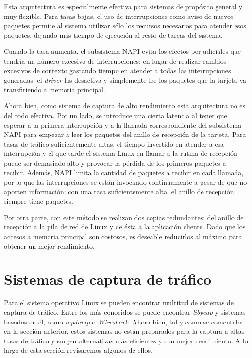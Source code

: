 \documentclass[twoside, 12pt, draft]{epstfg}
\begin{document}
Esta arquitectura es especialmente efectiva para sistemas de propósito general y muy flexible. Para tasas bajas, el uso de interrupciones como aviso de nuevos paquetes permite al sistema utilizar sólo los recursos necesarios para atender esos paquetes, dejando más tiempo de ejecución al resto de tareas del sistema.

Cuando la tasa aumenta, el subsistema NAPI evita los efectos perjudiciales que tendría un número excesivo de interrupciones: en lugar de realizar cambios excesivos de contexto gastando tiempo en atender a todas las interrupciones generadas, el \textit{driver} las desactiva y simplemente lee los paquetes que la tarjeta va transfiriendo a memoria principal.

Ahora bien, como sistema de captura de alto rendimiento esta arquitectura no es del todo efectiva. Por un lado, se introduce una cierta latencia al tener que esperar a la primera interrupción y a la llamada correspondiente del subsistema NAPI para empezar a leer los paquetes del anillo de recepción de la tarjeta. Para tasas de tráfico suficientemente altas, el tiempo invertido en atender a esa interrupción y el que tarde el sistema Linux en llamar a la rutina de recepción puede ser demasiado alto y provocar la pérdida de los primeros paquetes a recibir. Además, NAPI limita la cantidad de paquetes a recibir en cada llamada, por lo que las interrupciones se están invocando continuamente a pesar de que no aporten información: con una tasa suficientemente alta, el anillo de recepción siempre tiene paquetes.

Por otra parte, con este método se realizan dos copias redundantes: del anillo de recepción a la pila de red de Linux y de ésta a la aplicación cliente. Dado que los accesos a memoria principal son costosos, es deseable reducirlos al máximo para obtener un mejor rendimiento.

\section{Sistemas de captura de tráfico}

Para el sistema operativo Linux se pueden encontrar multitud de sistemas de captura de tráfico. Entre los más conocidos se puede encontrar \textit{libpcap} y sistemas basados en él, como \textit{tcpdump} o \textit{Wireshark}. Ahora bien, tal y como se comentaba en la sección anterior, estos sistemas no están preparados para la captura a altas tasas de tráfico y surgen alternativas más eficientes y con mejor rendimiento. A lo largo de esta sección revisaremos algunos de ellos.
\end{document}
